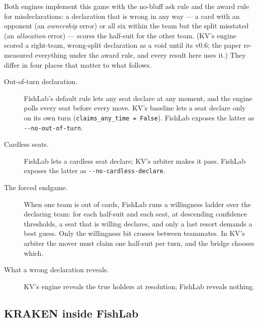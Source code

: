 \documentclass[11pt]{article}
\newcommand{\code}[1]{\texttt{#1}}
\newcommand{\flag}[1]{\texttt{-{}-#1}}
\begin{document}
Both engines implement this game with the no-bluff ask rule and the award rule for misdeclarations: a
declaration that is wrong in any way --- a card with an opponent (an \emph{ownership} error) or all
six within the team but the split misstated (an \emph{allocation} error) --- scores the half-suit for
the other team. (KV's engine scored a right-team, wrong-split declaration as a void until its v0.6; the
paper re-measured everything under the award rule, and every result here uses it.) They differ in four
places that matter to what follows.
\begin{description}
\item[Out-of-turn declaration.] FishLab's default rule lets any seat declare at any moment, and the
      engine polls every seat before every move. KV's baseline lets a seat declare only on its own
      turn (\code{claims\_any\_time = False}). FishLab exposes the latter as \flag{no-out-of-turn}.
\item[Cardless seats.] FishLab lets a cardless seat declare; KV's arbiter makes it pass. FishLab
      exposes the latter as \flag{no-cardless-declare}.
\item[The forced endgame.] When one team is out of cards, FishLab runs a willingness ladder over the
      declaring team: for each half-suit and each seat, at descending confidence thresholds, a seat
      that is willing declares, and only a last resort demands a best guess. Only the willingness bit
      crosses between teammates. In KV's arbiter the mover must claim one half-suit per turn, and the
      bridge chooses which.
\item[What a wrong declaration reveals.] KV's engine reveals the true holders at resolution; FishLab
      reveals nothing.
\end{description}

\subsection{KRAKEN inside FishLab}
\end{document}

